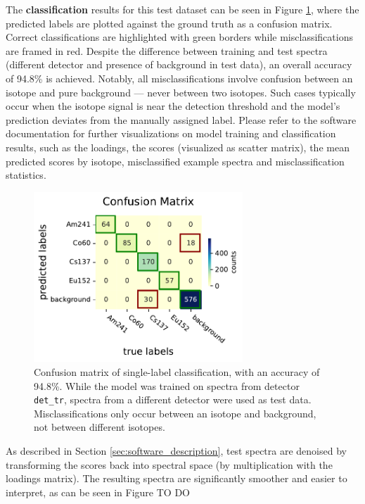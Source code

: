 \documentclass[preprint,12pt, a4paper]{elsarticle}
\begin{document}
The \textbf{classification} results for this test dataset can be seen in Figure \ref{fig:confusion_matrix}, where the predicted labels are plotted against the ground truth as a confusion matrix. Correct classifications are highlighted with green borders while misclassifications are framed in red. Despite the difference between training and test spectra (different detector and presence of background in test data), an overall accuracy of 94.8\% is achieved. Notably, all misclassifications involve confusion between an isotope and pure background — never between two isotopes. Such cases typically occur when the isotope signal is near the detection threshold and the model's prediction deviates from the manually assigned label. Please refer to the software documentation for further visualizations on model training and classification results, such as the loadings, the scores (visualized as scatter matrix), the mean predicted scores by isotope, misclassified example spectra and misclassification statistics. 

\begin{figure}
\centering
\includegraphics[width=0.7\textwidth]{Confusion_matrix_.pdf}
\caption{Confusion matrix of single-label classification, with an accuracy of 94.8\%. While the model was trained on spectra from detector \texttt{det\_tr}, spectra from a different detector were used as test data. Misclassifications only occur between an isotope and background, not between different isotopes.}
\label{fig:confusion_matrix}
\end{figure}

As described in Section \ref{sec:software_description}, test spectra are denoised by transforming the scores back into spectral space (by multiplication with the loadings matrix). The resulting spectra are significantly smoother and easier to interpret, as can be seen in Figure %
TO DO
\end{document}
